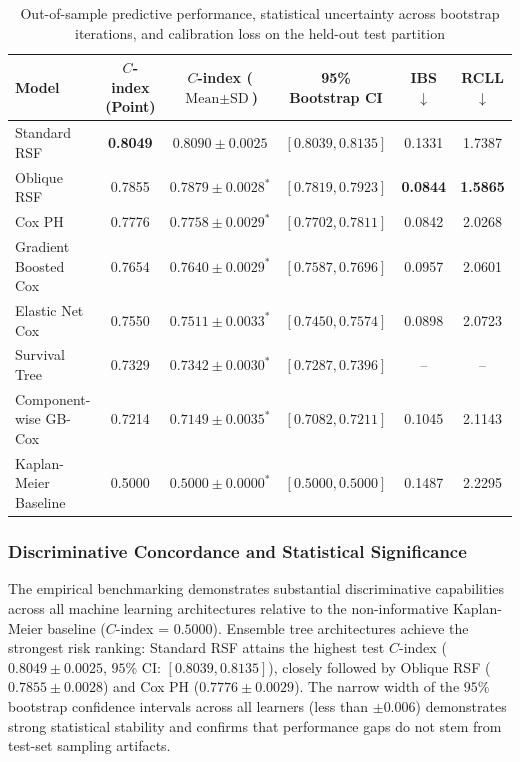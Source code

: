 \documentclass[pdflatex,iicol,sn-mathphys-ay]{sn-jnl}
\theoremstyle{thmstyleone}%
\theoremstyle{thmstyletwo}%
\theoremstyle{thmstylethree}%
\begin{document}
\begin{table}[htbp]
\centering
\small
\caption{Out-of-sample predictive performance, statistical uncertainty across bootstrap iterations, and calibration loss on the held-out test partition}\label{tab:performance_comparison}
\begin{tabular*}{\textwidth}{@{\extracolsep{\fill}} lccccc}
\toprule
Model & $C$-index (Point) & $C$-index ($\text{Mean} \pm \text{SD}$) & 95\% Bootstrap CI & IBS $\downarrow$ & RCLL $\downarrow$ \\
\midrule
Standard RSF & \textbf{0.8049} & $0.8090 \pm 0.0025$ & $[0.8039, 0.8135]$ & 0.1331 & 1.7387 \\
Oblique RSF & 0.7855 & $0.7879 \pm 0.0028^*$ & $[0.7819, 0.7923]$ & \textbf{0.0844} & \textbf{1.5865} \\
Cox PH & 0.7776 & $0.7758 \pm 0.0029^*$ & $[0.7702, 0.7811]$ & 0.0842 & 2.0268 \\
Gradient Boosted Cox & 0.7654 & $0.7640 \pm 0.0029^*$ & $[0.7587, 0.7696]$ & 0.0957 & 2.0601 \\
Elastic Net Cox & 0.7550 & $0.7511 \pm 0.0033^*$ & $[0.7450, 0.7574]$ & 0.0898 & 2.0723 \\
Survival Tree & 0.7329 & $0.7342 \pm 0.0030^*$ & $[0.7287, 0.7396]$ & -- & -- \\
Component-wise GB-Cox & 0.7214 & $0.7149 \pm 0.0035^*$ & $[0.7082, 0.7211]$ & 0.1045 & 2.1143 \\
Kaplan-Meier Baseline & 0.5000 & $0.5000 \pm 0.0000^*$ & $[0.5000, 0.5000]$ & 0.1487 & 2.2295 \\
\bottomrule
\end{tabular*}
\end{table}

\subsubsection{Discriminative Concordance and Statistical Significance}
The empirical benchmarking demonstrates substantial discriminative capabilities across all machine learning architectures relative to the non-informative Kaplan-Meier baseline ($C$-index = $0.5000$). Ensemble tree architectures achieve the strongest risk ranking: Standard RSF attains the highest test $C$-index ($0.8049 \pm 0.0025$, $95\%$ CI: $[0.8039, 0.8135]$), closely followed by Oblique RSF ($0.7855 \pm 0.0028$) and Cox PH ($0.7776 \pm 0.0029$). The narrow width of the $95\%$ bootstrap confidence intervals across all learners (less than $\pm 0.006$) demonstrates strong statistical stability and confirms that performance gaps do not stem from test-set sampling artifacts.
\end{document}
